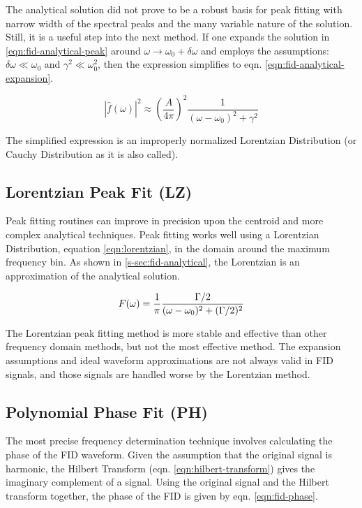 The analytical solution did not prove to be a robust basis for peak fitting with narrow width of the spectral peaks and the many variable nature of the solution.  Still, it is a useful step into the next method.  If one expands the solution in \ref{eqn:fid-analytical-peak} around $\omega \rightarrow \omega_0 + \delta \omega$ and employs the assumptions: $\delta \omega \ll \omega_0$ and $\gamma^2 \ll \omega_0^2$, then the expression simplifies to eqn. \ref{eqn:fid-analytical-expansion}.

\begin{equation}
\label{eqn:fid-analytical-expansion}
\left| \hat{f}(\omega) \right|^2 \approx
\left(\frac{A}{4\pi}\right)^2 
\frac{1}{(\omega - \omega_0)^2 + \gamma^2}
\end{equation}

\noindent
The simplified expression is an improperly normalized Lorentzian Distribution (or Cauchy Distribution as it is also called).

\subsection{Lorentzian Peak Fit (LZ)}

Peak fitting routines can improve in precision upon the centroid and more complex analytical techniques.  Peak fitting works well using a Lorentzian Distribution, equation \ref{eqn:lorentzian}, in the domain around the maximum frequency bin. As shown in \ref{s-sec:fid-analytical}, the Lorentzian is an approximation of the analytical solution.

\begin{equation}
\label{eqn:lorentzian}
F(\omega) = \frac{1}{\pi} \\
\frac{\Gamma / 2}{(\omega - \omega_0)^2 + (\Gamma / 2)^2}
\end{equation}

The Lorentzian peak fitting method is more stable and effective than other frequency domain methods, but not the most effective method.  The expansion assumptions and ideal waveform approximations are not always valid in FID signals, and those signals are handled worse by the Lorentzian method.

\subsection{Polynomial Phase Fit (PH)}
The most precise frequency determination technique involves calculating the phase of the FID waveform.  Given the assumption that the original signal is harmonic, the Hilbert Transform (eqn. \ref{eqn:hilbert-transform}) gives the imaginary complement of a signal.  Using the original signal and the Hilbert transform together, the phase of the FID is given by eqn. \ref{eqn:fid-phase}.

